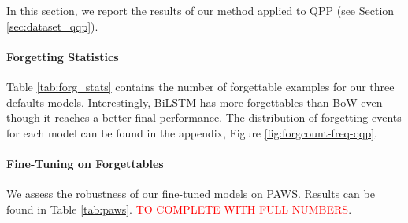 
In this section, we report the results of our method applied to QPP (see Section \ref{sec:dataset_qqp}).

\paragraph{Forgetting Statistics} Table \ref{tab:forg_stats} contains the number of forgettable examples for our three defaults models. Interestingly, BiLSTM has more forgettables than BoW even though it reaches a better final performance. The distribution of forgetting events for each model can be found in the appendix, Figure \ref{fig:forgcount-freq-qqp}.

\paragraph{Fine-Tuning on Forgettables} We assess the robustness of our fine-tuned models on PAWS. Results can be found in Table \ref{tab:paws}. \textcolor{red}{TO COMPLETE WITH FULL NUMBERS}. 


